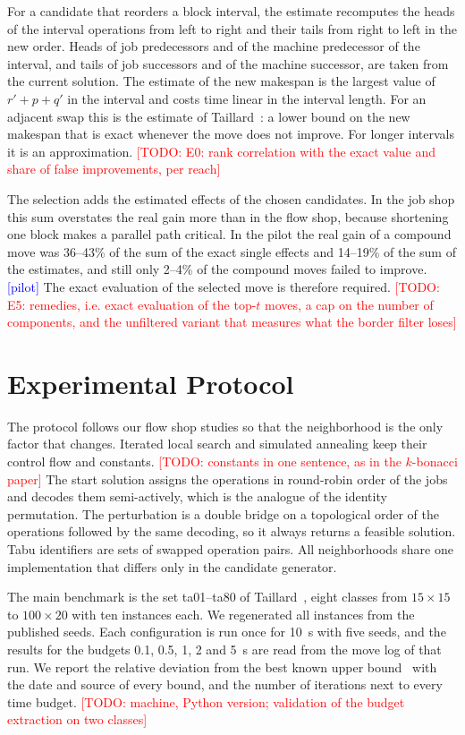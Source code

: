 \documentclass[10pt,twocolumn]{article}
\newcommand{\todo}[1]{\textcolor{red}{[TODO: #1]}}
\newcommand{\pilot}{\textcolor{blue}{[pilot]}}
\begin{document}
For a candidate that reorders a block interval, the estimate recomputes
the heads of the interval operations from left to right and their tails
from right to left in the new order. Heads of job predecessors and of the
machine predecessor of the interval, and tails of job successors and of
the machine successor, are taken from the current solution. The estimate
of the new makespan is the largest value of $r'+p+q'$ in the interval and
costs time linear in the interval length. For an adjacent swap this is the
estimate of Taillard~\cite{taillard1994}: a lower bound on the new
makespan that is exact whenever the move does not improve. For longer
intervals it is an approximation. \todo{E0: rank correlation with the
exact value and share of false improvements, per reach}

The selection adds the estimated effects of the chosen candidates. In the
job shop this sum overstates the real gain more than in the flow shop,
because shortening one block makes a parallel path critical. In the pilot
the real gain of a compound move was 36--43\% of the sum of the exact
single effects and 14--19\% of the sum of the estimates, and still only
2--4\% of the compound moves failed to improve. \pilot{} The exact
evaluation of the selected move is therefore required. \todo{E5: remedies,
i.e. exact evaluation of the top-$t$ moves, a cap on the number of
components, and the unfiltered variant that measures what the border
filter loses}

\section{Experimental Protocol}\label{sec:setup}

The protocol follows our flow shop studies so that the neighborhood is the
only factor that changes. Iterated local search and simulated annealing
keep their control flow and constants. \todo{constants in one sentence,
as in the $k$-bonacci paper} The start solution assigns the operations in
round-robin order of the jobs and decodes them semi-actively, which is the
analogue of the identity permutation. The perturbation is a double bridge
on a topological order of the operations followed by the same decoding, so
it always returns a feasible solution. Tabu identifiers are sets of
swapped operation pairs. All neighborhoods share one implementation that
differs only in the candidate generator.

The main benchmark is the set ta01--ta80 of Taillard~\cite{taillard1993},
eight classes from $15\times15$ to $100\times20$ with ten instances each.
We regenerated all instances from the published seeds. Each configuration
is run once for 10~s with five seeds, and the results for the budgets 0.1,
0.5, 1, 2 and 5~s are read from the move log of that run. We report the
relative deviation from the best known upper bound~\cite{vanhoorn2018}
with the date and source of every bound, and the number of iterations
next to every time budget. \todo{machine, Python version; validation of
the budget extraction on two classes}
\end{document}
